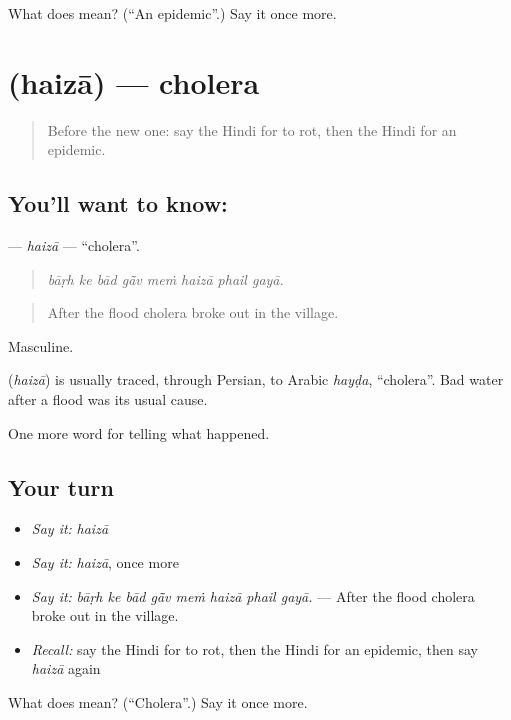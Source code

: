 \begin{tcolorbox}[breakable,colback=teal!4,colframe=teal!35!black,title={Before you move on}]
What does  mean? (\textquotedblleft{}An epidemic\textquotedblright{}.) Say it once more.
\end{tcolorbox}
\section[\texorpdfstring{\hi{हैज़ा} (haizā)}{हैज़ा (haizā)}]{ (haizā) — cholera}

\label{lesson:HI-C306-haiza}



\begin{quote}
Before the new one: say the Hindi for to rot, then the Hindi for an epidemic.
\end{quote}

\subsection*{You'll want to know: }
\textbf{} — \emph{haizā} — \textquotedblleft{}cholera\textquotedblright{}.

\begin{quote}
       
\end{quote}

\begin{quote}
\emph{bāṛh ke bād gā̃v meṁ haizā phail gayā.}
\end{quote}

\begin{quote}
After the flood cholera broke out in the village.
\end{quote}

Masculine.

\begin{cousinweb}
\textbf{} (\emph{haizā}) is usually traced, through Persian, to Arabic \emph{hayḍa}, \textquotedblleft{}cholera\textquotedblright{}. Bad water after a flood was its usual cause.
\end{cousinweb}

\begin{grammarlens}[title={What you've built}]
One more word for telling what happened.
\end{grammarlens}

\subsection*{Your turn}
\begin{itemize}
\raggedright
  \item \emph{Say it:} \emph{haizā}
  \item \emph{Say it:} \emph{haizā}, once more
  \item \emph{Say it:} \emph{bāṛh ke bād gā̃v meṁ haizā phail gayā.} — After the flood cholera broke out in the village.
  \item \emph{Recall:} say the Hindi for to rot, then the Hindi for an epidemic, then say \emph{haizā} again
\end{itemize}

\begin{tcolorbox}[breakable,colback=teal!4,colframe=teal!35!black,title={Before you move on}]
What does  mean? (\textquotedblleft{}Cholera\textquotedblright{}.) Say it once more.
\end{tcolorbox}
